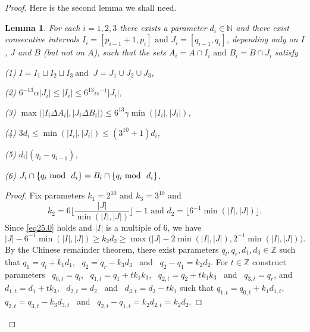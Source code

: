 \documentclass[12pt,reqno]{amsart}
\newtheorem{lemma}[theorem]{Lemma}
\theoremstyle{definition}
\renewcommand\leq{\leqslant}
\renewcommand\geq{\geqslant}
\begin{document}
\begin{proof}
\vspace{10pt}
Here is the second lemma we shall need.

\begin{lemma}\label{lem25}
For each $i=1,2,3$ there exists a parameter $d_i \in \mathbb{N}$ and there exist consecutive intervals $I_i=[p_{i-1}+1, p_i] \text{ and } J_i=[q_{i-1}, q_i]$,
depending only on $I$, $J$ and $B$ (but not on $A$), such that the sets $A_i=A\cap I_i \text{ and } B_i=B\cap J_i$
satisfy

{\rm (1)} \hspace{92pt} $I=I_1\sqcup I_2\sqcup I_3 \ \text{and }\ J=J_1 \cup J_2 \cup J_3$,

\vspace{8pt}
{\rm (2)} \hspace{115pt}     $6^{-13}\alpha |J_i| \leq |I_i| \leq 6^{13}\alpha^{-1} |J_i|$,

{\rm (3)} \hspace{75pt}  $\max\bigg(|I_i\Delta A_i|, |J_i\Delta B_i|\bigg) \leq 6^{13}\gamma \min (|I_i|, |J_i|)$,

{\rm (4)} \hspace{105pt}  $3d_i \leq \min (|I_i|, |J_i|) \leq (3^{10}+1)d_i$,

\vspace{8pt}
{\rm (5)} \hspace{150pt}  $d_i|(q_i-q_{i-1})$,

\vspace{8pt}
{\rm (6)} \hspace{97pt} $J_i\cap \{q_i \ \text{\rm mod }\ d_i \} = B_i\cap \{q_i \ \text{\rm mod }\  d_i \}$.

\end{lemma}

\begin{proof}
Fix parameters $k_{1}=2^{10} \text{ and } k_3=3^{10}$
and
\begin{equation}\label{eq25.249}
k_2=6\lfloor \frac{|J|}{\min(|I|,|J|)} \rfloor-1 \text{ and } d_2=\lfloor6^{-1}\min(|I|,|J|)\rfloor.
\end{equation}
Since \eqref{eq25.0} holds and  $|I|$ is a multiple of 6,  we have
\begin{equation}\label{eq25.2495}
|J|-6^{-1}\min(|I|,|J|)\geq k_2d_2\geq \max\bigg(|J|-2\min(|I|,|J|),2^{-1}\min(|I|,|J|)\bigg).
\end{equation}
By the Chinese remainder theorem, there exist parameters $q_{l}, q_{r}, d_1, d_3 \in \mathbb{Z}$ such that
$q_1=q_l+k_1d_1$, \   $q_{2}=q_r-k_3d_3$ \  and \ $q_2-q_1=k_2d_2$.
For $t\in \mathbb{Z}$ construct parameters \
$q_{0,t}=q_l$, \ $q_{1,t}=q_1+tk_1k_3$, \  $q_{2,t}= q_2+tk_1k_3$ \  and \ $q_{3,t}=q_r$,
and
$d_{1,t}=d_1+tk_3$, \  $d_{2,t}=d_2$ \ and \ $d_{3,t}=d_3-tk_1$
such that
$q_{1,t}=q_{0,t}+k_1d_{1,t}$, \   $q_{2,t}=q_{3,t}-k_3d_{3,t}$ \ and \ $q_{2,t}-q_{1,t}=k_{2}d_{2,t}=k_2d_2$.



\end{proof}
\end{proof}
\end{document}
